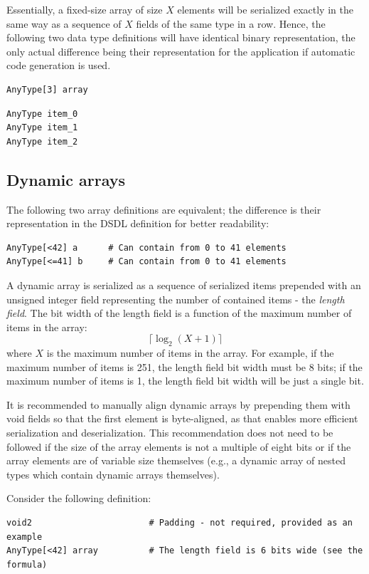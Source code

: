 Essentially, a fixed-size array of size $X$ elements will be serialized exactly in the same way
as a sequence of $X$ fields of the same type in a row.
Hence, the following two data type definitions will have identical binary representation,
the only actual difference being their representation for the application
if automatic code generation is used.

\begin{verbatim}
AnyType[3] array
\end{verbatim}

\begin{verbatim}
AnyType item_0
AnyType item_1
AnyType item_2
\end{verbatim}

\subsection{Dynamic arrays}

The following two array definitions are equivalent;
the difference is their representation in the DSDL definition for better readability:
\begin{verbatim}
AnyType[<42] a      # Can contain from 0 to 41 elements
AnyType[<=41] b     # Can contain from 0 to 41 elements
\end{verbatim}

A dynamic array is serialized as a sequence of serialized items prepended with an unsigned
integer field representing the number of contained items - the \emph{length field}.
The bit width of the length field is a function of the maximum number of items in the array:
$$\lceil{}\log_2 (X + 1)\rceil{}$$
where $X$ is the maximum number of items in the array.
For example, if the maximum number of items is 251, the length field bit width must be 8 bits;
if the maximum number of items is 1, the length field bit width will be just a single bit.

It is recommended to manually align dynamic arrays by prepending them with void fields
so that the first element is byte-aligned, as that enables more efficient serialization and
deserialization.
This recommendation does not need to be followed if the size of the array elements is not
a multiple of eight bits or if the array elements are of variable size themselves
(e.g., a dynamic array of nested types which contain dynamic arrays themselves).

Consider the following definition:

\begin{verbatim}
void2                       # Padding - not required, provided as an example
AnyType[<42] array          # The length field is 6 bits wide (see the formula)
\end{verbatim}

